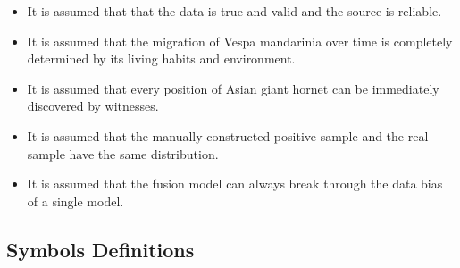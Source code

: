 \documentclass{mcmthesis}
\numberwithin{figure}{section}
\numberwithin{table}{section}
\begin{document}
\begin{itemize}
\item It is assumed that that the data is true and valid and the source is reliable.

\item It is assumed that the migration of Vespa mandarinia over time is completely determined by its living habits and environment.

\item It is assumed that every position of Asian giant hornet can be immediately discovered by witnesses.


\item It is assumed that the manually constructed positive sample and the real sample have the same distribution.


\item It is assumed that the fusion model can always break through the data bias of a single model.


\end{itemize}

\subsection{Symbols Definitions}
\end{document}
